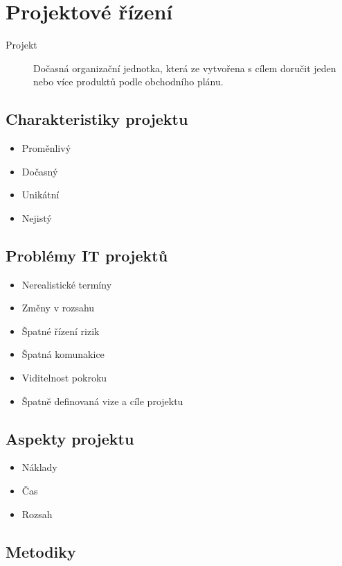 \section{Projektové řízení}
  \begin{description}
    \item[Projekt] Dočasná organizační jednotka, která ze vytvořena s cílem doručit jeden nebo více produktů podle obchodního plánu.
  \end{description}

  \subsection{Charakteristiky projektu}
    \begin{itemize}
      \item Proměnlivý
      \item Dočasný
      \item Unikátní
      \item Nejistý
    \end{itemize}

  \subsection{Problémy IT projektů}
    \begin{itemize}
      \item Nerealistické termíny
      \item Změny v rozsahu
      \item Špatné řízení rizik
      \item Špatná komunakice
      \item Viditelnost pokroku
      \item Špatně definovaná vize a cíle projektu
    \end{itemize}

  \subsection{Aspekty projektu}
    \begin{itemize}
      \item Náklady
      \item Čas
      \item Rozsah
    \end{itemize}

  \subsection{Metodiky}

